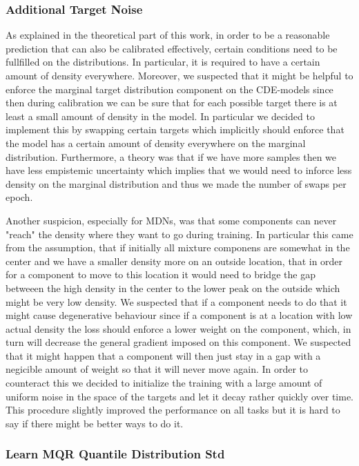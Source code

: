 \subsubsection{Additional Target Noise}

As explained in the theoretical part of this work, in order to be a reasonable prediction that can also be calibrated effectively, certain conditions need to be fullfilled on the distributions. In particular, it is required to have a certain amount of density everywhere. Moreover, we suspected that it might be helpful to enforce the marginal target distribution component on the CDE-models since then during calibration we can be sure that for each possible target there is at least a small amount of density in the model. In particular we decided to implement this by swapping certain targets which implicitly should enforce that the model has a certain amount of density everywhere on the marginal distribution. Furthermore, a theory was that if we have more samples then we have less empistemic uncertainty which implies that we would need to inforce less density on the marginal distribution and thus we made the number of swaps per epoch.

Another suspicion, especially for MDNs, was that some components can never "reach" the density where they want to go during training. In particular this came from the assumption, that if initially all mixture componens are somewhat in the center and we have a smaller density more on an outside location, that in order for a component to move to this location it would need to bridge the gap betweeen the high density in the center to the lower peak on the outside which might be very low density. We suspected that if a component needs to do that it might cause degenerative behaviour since if a component is at a location with low actual density the loss should enforce a lower weight on the component, which, in turn will decrease the general gradient imposed on this component. We suspected that it might happen that a component will then just stay in a gap with a negicible amount of weight so that it will never move again. In order to counteract this we decided to initialize the training with a large amount of uniform noise in the space of the targets and let it decay rather quickly over time. This procedure slightly improved the performance on all tasks but it is hard to say if there might be better ways to do it.

\subsubsection{Learn MQR Quantile Distribution Std}

